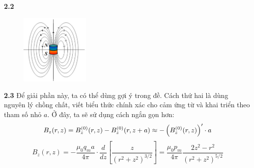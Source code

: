 \noindent\textbf{2.2}\\
\begin{figure}[H]
  \centering
  \includegraphics[width=0.3\textwidth]{Figures/Solutions/Fig 2.2.png}
\end{figure}

\noindent\textbf{2.3} Để giải phần này, ta có thể dùng gợi ý trong đề. Cách thứ hai là dùng nguyên lý chồng chất, viết biểu thức chính xác cho cảm ứng từ và khai triển theo tham số nhỏ $a$. Ở đây, ta sẽ sử dụng cách ngắn gọn hơn:
\begin{equation*}
  B_z(r, z) = B^{(0)}_z(r, z) - B^{(0)}_z(r, z + a) \approx -\left(B^{(0)}_z(r, z)\right)' \cdot a    \\
\end{equation*}
\begin{equation*}
  B_z(r, z)  = -\frac{\mu_0 q_m a}{4\pi} \cdot \frac{d}{dz} \left[ \frac{z}{(r^2 + z^2)^{3/2}} \right]  = \frac{\mu_0 p_m}{4\pi} \frac{2z^2 - r^2}{(r^2 + z^2)^{5/2}}
\end{equation*}

